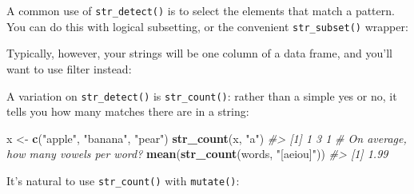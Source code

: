 \documentclass[]{book}
\newenvironment{Shaded}{\begin{snugshade}}{\end{snugshade}}
\newcommand{\CommentTok}[1]{\textcolor[rgb]{0.56,0.35,0.01}{\textit{#1}}}
\newcommand{\DataTypeTok}[1]{\textcolor[rgb]{0.13,0.29,0.53}{#1}}
\newcommand{\KeywordTok}[1]{\textcolor[rgb]{0.13,0.29,0.53}{\textbf{#1}}}
\newcommand{\NormalTok}[1]{#1}
\newcommand{\OperatorTok}[1]{\textcolor[rgb]{0.81,0.36,0.00}{\textbf{#1}}}
\newcommand{\StringTok}[1]{\textcolor[rgb]{0.31,0.60,0.02}{#1}}
\begin{document}
A common use of \texttt{str\_detect()} is to select the elements that match a pattern. You can do this with logical subsetting, or the convenient \texttt{str\_subset()} wrapper:

\begin{Shaded}
\end{Shaded}

Typically, however, your strings will be one column of a data frame, and you'll want to use filter instead:

\begin{Shaded}
\end{Shaded}

A variation on \texttt{str\_detect()} is \texttt{str\_count()}: rather than a simple yes or no, it tells you how many matches there are in a string:

\begin{Shaded}
\begin{Highlighting}[]
\NormalTok{x <-}\StringTok{ }\KeywordTok{c}\NormalTok{(}\StringTok{"apple"}\NormalTok{, }\StringTok{"banana"}\NormalTok{, }\StringTok{"pear"}\NormalTok{)}
\KeywordTok{str_count}\NormalTok{(x, }\StringTok{"a"}\NormalTok{)}
\CommentTok{#> [1] 1 3 1}
\CommentTok{# On average, how many vowels per word?}
\KeywordTok{mean}\NormalTok{(}\KeywordTok{str_count}\NormalTok{(words, }\StringTok{"[aeiou]"}\NormalTok{))}
\CommentTok{#> [1] 1.99}
\end{Highlighting}
\end{Shaded}

It's natural to use \texttt{str\_count()} with \texttt{mutate()}:
\end{document}
